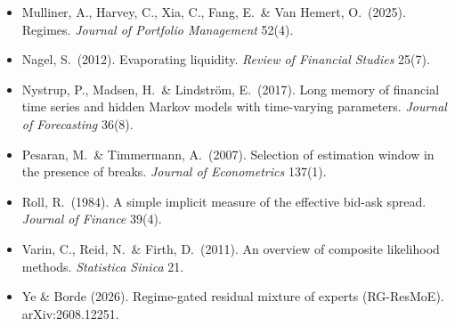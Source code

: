 {\begin{itemize}[leftmargin=*,itemsep=1pt]
  \emph{Journal of Finance} 71(1).
\item Mulliner, A., Harvey, C., Xia, C., Fang, E.\ \& Van Hemert, O.\ (2025). Regimes. \emph{Journal of
  Portfolio Management} 52(4).
\item Nagel, S.\ (2012). Evaporating liquidity. \emph{Review of Financial Studies} 25(7).
\item Nystrup, P., Madsen, H.\ \& Lindstr\"om, E.\ (2017). Long memory of financial time series and hidden
  Markov models with time-varying parameters. \emph{Journal of Forecasting} 36(8).
\item Pesaran, M.\ \& Timmermann, A.\ (2007). Selection of estimation window in the presence of breaks.
  \emph{Journal of Econometrics} 137(1).
\item Roll, R.\ (1984). A simple implicit measure of the effective bid-ask spread. \emph{Journal of
  Finance} 39(4).
\item Varin, C., Reid, N.\ \& Firth, D.\ (2011). An overview of composite likelihood methods.
  \emph{Statistica Sinica} 21.
\item Ye \& Borde (2026). Regime-gated residual mixture of experts (RG-ResMoE). arXiv:2608.12251.
\end{itemize}}
